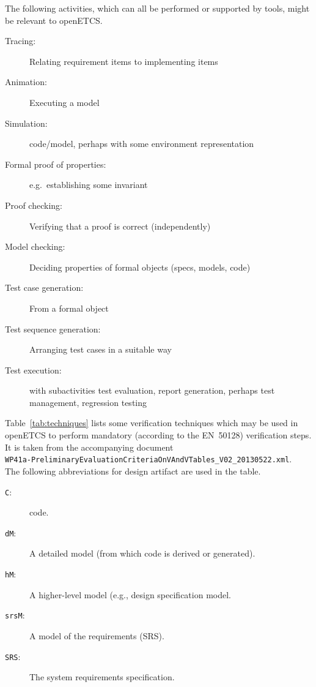 \documentclass{template/openetcs_article}
\begin{document}
The following activities, which can all be performed or supported by
tools, might be relevant to openETCS. 
\begin{description}
\item[Tracing:] Relating requirement items to implementing items
\item[Animation:] Executing a model 
\item[Simulation:] code/model, perhaps with some environment representation 
\item[Formal proof of properties:] e.g.\ establishing some invariant
\item[Proof checking:] Verifying that a proof is correct (independently)
\item[Model checking:] Deciding properties of formal objects (specs,
  models, code)
\item[Test case generation:] From a formal object
\item[Test sequence generation:] Arranging test cases in a suitable way
\item[Test execution:] with subactivities test evaluation, report
  generation, perhaps test management, regression testing
\end{description}

Table~\ref{tab:techniques} lists some verification techniques which may be
used in openETCS to perform mandatory (according to the EN~50128)
verification steps. It is taken from the accompanying document\\
\texttt{WP41a-PreliminaryEvaluationCriteriaOnVAndVTables\_V02\_20130522.xml}. 
\\ The following abbreviations for design artifact are used in the table.
\begin{description}
\item[\texttt{C}:] code.
\item[\texttt{dM}:] A detailed model (from which code is derived or generated).
\item[\texttt{hM}:] A higher-level model (e.g., design specification model.
\item[\texttt{srsM}:] A model of the requirements (SRS).
\item[\texttt{SRS}:] The system requirements specification. 
\end{description}
\end{document}
